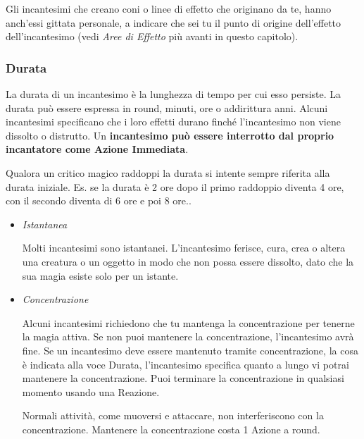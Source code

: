 \begin{multicols}{2}
Gli incantesimi che creano coni o linee di effetto che originano da te, hanno anch'essi gittata personale, a indicare che sei tu il punto di origine dell'effetto dell'incantesimo (vedi \emph{Aree di Effetto} più avanti in questo capitolo).


\subsubsection{Durata}\label{magiedurata}\hypertarget{magiedurata}{}

La durata di un incantesimo è la lunghezza di tempo per cui esso persiste. La durata può essere espressa in round, minuti, ore o addirittura anni. Alcuni incantesimi specificano che i loro effetti durano finché l'incantesimo non viene dissolto o distrutto. Un \textbf{incantesimo può essere interrotto dal proprio incantatore come Azione Immediata}.

Qualora un critico magico raddoppi la durata si intente sempre riferita alla durata iniziale. Es. se la durata è 2 ore dopo il primo raddoppio diventa 4 ore, con il secondo diventa di 6 ore e poi 8 ore..

\begin{itemize}[leftmargin=*] \setlength{\itemsep}{0pt}

\item
\emph{Istantanea}

Molti incantesimi sono istantanei. L'incantesimo ferisce, cura, crea o altera una creatura o un oggetto in modo che non possa essere dissolto, dato che la sua magia esiste solo per un istante.

\item

\emph{Concentrazione}

Alcuni incantesimi richiedono che tu mantenga la concentrazione per tenerne la magia attiva. Se non puoi mantenere la concentrazione, l'incantesimo avrà fine. Se un incantesimo deve essere mantenuto tramite concentrazione, la cosa è indicata alla voce Durata, l'incantesimo specifica quanto a lungo vi potrai mantenere la concentrazione. Puoi terminare la concentrazione in qualsiasi momento usando una Reazione.

Normali attività, come muoversi e attaccare, non interferiscono con la concentrazione. Mantenere la concentrazione costa 1 Azione a round.
\end{itemize}


\end{multicols}

